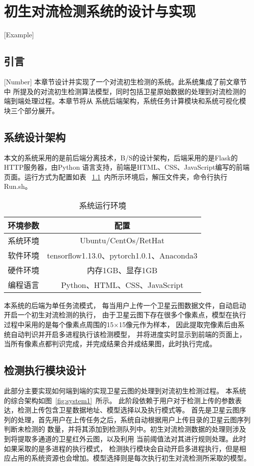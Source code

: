 \chapter{初生对流检测系统的设计与实现}[Example]

\section{引言}[Number]
本章节设计并实现了一个对流初生检测的系统。此系统集成了前文章节中
所提及的对流初生检测算法模型，同时包括卫星原始数据的处理到对流检测的端到端处理过程。本章节将从
系统后端架构，系统任务计算模块和系统可视化模块三个部分展开。
\section{系统设计架构}
本文的系统采用的是前后端分离技术，B/S的设计架构，后端采用的是Flask的HTTP服务器，由Python
语言支持，前端是HTML、CSS、JavaScript编写的前端页面。运行方式为配置如表
~\ref{tab:env3}~内所示环境后，解压文件夹，命令行执行Run.sh。

\begin{table}[h]
	\renewcommand{\arraystretch}{1.3}
	\caption{系统运行环境}
	\label{tab:env3}
	\vspace{0.5em}\centering\wuhao
	\begin{tabular}{c c}
		\toprule[1.5pt] 环境参数 & 配置 \\
		\midrule[1pt] 
		系统环境 & Ubuntu/CentOs/RetHat \\
		软件环境 & tensorflow1.13.0、pytorch1.0.1、Anaconda3 \\
        硬件环境 & 内存1GB、显存1GB \\ 
		编程语言 & Python、HTML、CSS、JavaScript \\
		\bottomrule[1.5pt]
	\end{tabular}
\end{table}

本系统的后端为单任务流模式，
每当用户上传一个卫星云图数据文件，自动启动开启一个初生对流检测的执行，
由于卫星云图下存在很多个像素点，模型在执行过程中采用的是每个像素点周围的15$\times$15像元作为样本，
因此提取完像素后由系统自动判识并开启多进程执行该检测模型，
并将进度实时显示到前端的页面上，当所有像素点都判识完成，并完成结果合并成结果图，此时执行完成。

\section{检测执行模块设计}
此部分主要实现如何端到端的实现卫星云图的处理到对流初生检测过程。
本系统的综合架构如图~\ref{fig:system1}~所示。
此阶段依赖于用户对于检测上传的参数表达，检测上传包含卫星数据地址、模型选择以及执行模式等。
首先是卫星云图序列的处理，首先用户在上传任务之后，系统自动根据用户上传目录的卫星云图序列判断未检测的
数量，并将其添加到检测队列中。初生对流检测数据的处理则涉及到将提取多通道的卫星红外云图，以及利用
当前阈值法对其进行规则处理。此时如果采取的是多进程的执行模式，
检测执行模块会自动开启多进程执行，但是相应占用的系统资源也会增加。模型选择则是每次执行初生对流检测所采取的模型。

